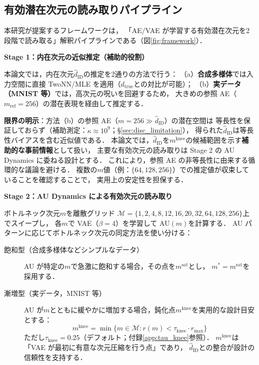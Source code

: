 \documentclass[11pt,a4paper]{jsarticle}
\newcommand{\dzopt}{m^*}
\newcommand{\dtrue}{d_{\mathrm{true}}}
\newcommand{\kap}{\kappa}
\newcommand{\dzsat}{m^{\mathrm{sat}}}
\newcommand{\mknee}{m^{\mathrm{knee}}}
\begin{document}
\subsection{有効潜在次元の読み取りパイプライン}\label{sec:framework_pipeline}

本研究が提案するフレームワークは，
「AE/VAE が学習する有効潜在次元を2段階で読み取る」解釈パイプラインである（図\ref{fig:framework}）．

\textbf{Stage 1：内在次元の近似推定（補助的役割）}

本論文では，内在次元$\hat{d}_\mathrm{ID}$の推定を2通りの方法で行う：
（a）\textbf{合成多様体}では入力空間に直接 TwoNN/MLE を適用（$\dtrue$との対比が可能）；
（b）\textbf{実データ（MNIST 等）}では，高次元の呪いを回避するため，
大きめの参照 AE（$m_{\mathrm{ref}} = 256$）の潜在表現を経由して推定する．

\textbf{限界の明示}：方法（b）の参照 AE（$m = 256 \gg \hat{d}_\mathrm{ID}$）の潜在空間は
等長性を保証しておらず（補助測定：$\kap \approx 10^9$；§\ref{sec:disc_limitation}），
得られた$\hat{d}_\mathrm{ID}$は等長性バイアスを含む近似値である．
本論文では，$\hat{d}_\mathrm{ID}$を$\mknee$の候補範囲を示す\textbf{補助的な事前情報}として扱い，
主要な有効次元の読み取りは Stage 2 の AU Dynamics に委ねる設計とする．
これにより，参照 AE の非等長性に由来する循環的な議論を避ける．
複数の$m$値（例：$\{64, 128, 256\}$）での推定値が収束していることを確認することで，
実用上の安定性を担保する．

\textbf{Stage 2：AU Dynamics による有効次元の読み取り}

ボトルネック次元$m$を離散グリッド
$\mathcal{M} = \{1, 2, 4, 8, 12, 16, 20, 32, 64, 128, 256\}$上でスイープし，
各$m$で VAE（$\beta = 4$）を学習して AU$(m)$を計算する．
AU パターンに応じてボトルネック次元の同定方法を使い分ける：

\begin{description}
  \item[飽和型（合成多様体などシンプルなデータ）]
        AU が特定の$m$で急激に飽和する場合，その点を$\dzsat$とし，
        $\dzopt = \dzsat$を採用する．
  \item[漸増型（実データ，MNIST 等）]
        AU が$m$とともに緩やかに増加する場合，鈍化点$\mknee$を実用的な設計目安とする：
        \begin{equation}
          \mknee = \min\{m \in \mathcal{M} : r(m) < \tau_{\mathrm{knee}} \cdot r_{\max}\}
          \label{eq:mknee}
        \end{equation}
        ただし$\tau_{\mathrm{knee}} = 0.25$（デフォルト；付録\ref{app:tau_knee}参照）．
        $\mknee$は「VAE が最初に有意な次元圧縮を行う点」であり，
        $\hat{d}_\mathrm{ID}$との整合が設計の信頼性を支持する．
\end{description}
\end{document}
